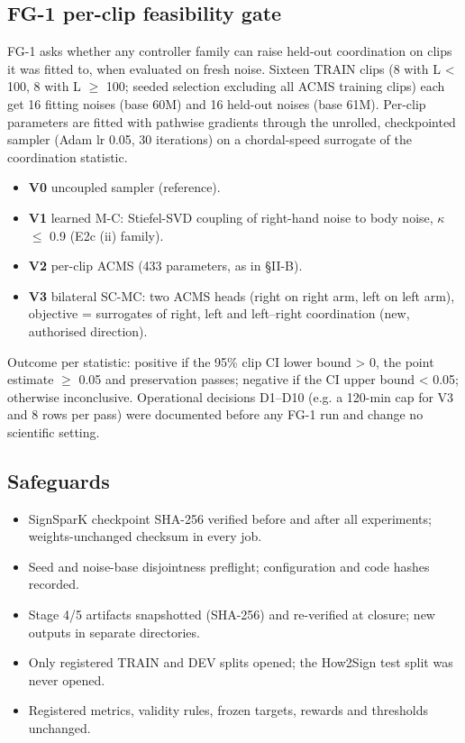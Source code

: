 \documentclass[conference]{IEEEtran}
\begin{document}
\subsection{FG-1 per-clip feasibility gate}
FG-1 asks whether any controller family can raise held-out coordination on clips it was fitted to, when evaluated on fresh noise. Sixteen TRAIN clips (8 with L < 100, 8 with L $\geq$ 100; seeded selection excluding all ACMS training clips) each get 16 fitting noises (base 60M) and 16 held-out noises (base 61M). Per-clip parameters are fitted with pathwise gradients through the unrolled, checkpointed sampler (Adam lr 0.05, 30 iterations) on a chordal-speed surrogate of the coordination statistic.

\begin{itemize}\item \textbf{V0} uncoupled sampler (reference).\item \textbf{V1} learned M-C: Stiefel-SVD coupling of right-hand noise to body noise, $\kappa$ $\leq$ 0.9 (E2c (ii) family).\item \textbf{V2} per-clip ACMS (433 parameters, as in §II-B).\item \textbf{V3} bilateral SC-MC: two ACMS heads (right on right arm, left on left arm), objective = surrogates of right, left and left--right coordination (new, authorised direction).\end{itemize}
Outcome per statistic: positive if the 95\% clip CI lower bound > 0, the point estimate $\geq$ 0.05 and preservation passes; negative if the CI upper bound < 0.05; otherwise inconclusive. Operational decisions D1--D10 (e.g. a 120-min cap for V3 and 8 rows per pass) were documented before any FG-1 run and change no scientific setting.

\subsection{Safeguards}
\begin{itemize}\item SignSparK checkpoint SHA-256 verified before and after all experiments; weights-unchanged checksum in every job.\item Seed and noise-base disjointness preflight; configuration and code hashes recorded.\item Stage 4/5 artifacts snapshotted (SHA-256) and re-verified at closure; new outputs in separate directories.\item Only registered TRAIN and DEV splits opened; the How2Sign test split was never opened.\item Registered metrics, validity rules, frozen targets, rewards and thresholds unchanged.\end{itemize}
\end{document}
